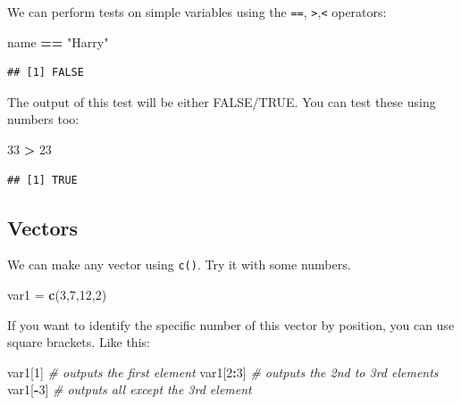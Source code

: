 \documentclass[
]{book}
\newenvironment{Shaded}{\begin{snugshade}}{\end{snugshade}}
\newcommand{\CommentTok}[1]{\textcolor[rgb]{0.56,0.35,0.01}{\textit{#1}}}
\newcommand{\DecValTok}[1]{\textcolor[rgb]{0.00,0.00,0.81}{#1}}
\newcommand{\FunctionTok}[1]{\textcolor[rgb]{0.13,0.29,0.53}{\textbf{#1}}}
\newcommand{\NormalTok}[1]{#1}
\newcommand{\OtherTok}[1]{\textcolor[rgb]{0.56,0.35,0.01}{#1}}
\newcommand{\SpecialCharTok}[1]{\textcolor[rgb]{0.81,0.36,0.00}{\textbf{#1}}}
\newcommand{\StringTok}[1]{\textcolor[rgb]{0.31,0.60,0.02}{#1}}
\begin{document}
We can perform tests on simple variables using the \texttt{==}, \texttt{\textgreater{}},\texttt{\textless{}} operators:

\begin{Shaded}
\begin{Highlighting}[]
\NormalTok{name }\SpecialCharTok{==} \StringTok{"Harry"}
\end{Highlighting}
\end{Shaded}

\begin{verbatim}
## [1] FALSE
\end{verbatim}

The output of this test will be either FALSE/TRUE.
You can test these using numbers too:

\begin{Shaded}
\begin{Highlighting}[]
\DecValTok{33} \SpecialCharTok{\textgreater{}} \DecValTok{23}
\end{Highlighting}
\end{Shaded}

\begin{verbatim}
## [1] TRUE
\end{verbatim}

\hypertarget{vectors}{%
\subsection*{Vectors}\label{vectors}}

We can make any vector using \texttt{c()}.
Try it with some numbers.

\begin{Shaded}
\begin{Highlighting}[]
\NormalTok{var1 }\OtherTok{=} \FunctionTok{c}\NormalTok{(}\DecValTok{3}\NormalTok{,}\DecValTok{7}\NormalTok{,}\DecValTok{12}\NormalTok{,}\DecValTok{2}\NormalTok{)}
\end{Highlighting}
\end{Shaded}

If you want to identify the specific number of this vector by position, you can use square brackets.
Like this:

\begin{Shaded}
\begin{Highlighting}[]
\NormalTok{var1[}\DecValTok{1}\NormalTok{]     }\CommentTok{\# outputs the first element}
\NormalTok{var1[}\DecValTok{2}\SpecialCharTok{:}\DecValTok{3}\NormalTok{]   }\CommentTok{\# outputs the 2nd to 3rd elements}
\NormalTok{var1[}\SpecialCharTok{{-}}\DecValTok{3}\NormalTok{]    }\CommentTok{\# outputs all except the 3rd element}
\end{Highlighting}
\end{Shaded}
\end{document}
